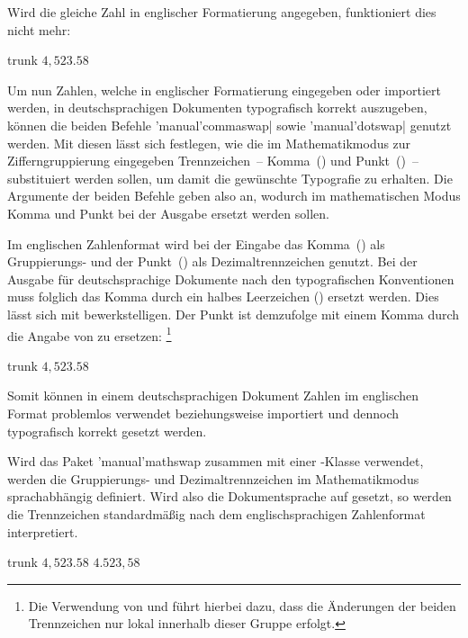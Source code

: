 \documentclass[%
  english,ngerman,%
  headings=small,%
]{tudscrartcl}
\begin{document}
\begin{Entity}{}
Wird die gleiche Zahl in englischer Formatierung angegeben, funktioniert dies 
nicht mehr:
%
\begin{Code}[input]{trunk}
\(4,523.58\)

\end{Code}

Um nun Zahlen, welche in englischer Formatierung eingegeben oder importiert 
werden, in deutschsprachigen Dokumenten typografisch korrekt auszugeben, können
die beiden Befehle \Macro'manual'{commaswap|\MPValue{\dots}} sowie 
\Macro'manual'{dotswap|\MPValue{\dots}} genutzt werden. Mit diesen lässt 
sich festlegen, wie die im Mathematikmodus zur Zifferngruppierung eingegeben 
Trennzeichen~-- Komma~(\PValue{,}) und Punkt~()~-- substituiert 
werden sollen, um damit die gewünschte Typografie zu erhalten. Die Argumente 
der beiden Befehle geben also an, wodurch im mathematischen Modus Komma und 
Punkt bei der Ausgabe ersetzt werden sollen.

Im englischen Zahlenformat wird bei der Eingabe das Komma~(\PValue{,}) als 
Gruppierungs- und der Punkt~() als Dezimaltrennzeichen genutzt. Bei 
der Ausgabe für deutschsprachige Dokumente nach den typografischen Konventionen 
muss folglich das Komma durch ein halbes Leerzeichen (\Macro*{,}) ersetzt 
werden. Dies lässt sich mit  
bewerkstelligen. Der Punkt ist demzufolge mit einem Komma durch die Angabe von
 zu ersetzen:%
\footnote{%
  Die Verwendung von  und  führt hierbei 
  dazu, dass die Änderungen der beiden Trennzeichen nur lokal innerhalb dieser 
  Gruppe erfolgt.
}
%
\begin{Code}[input]{trunk}
\begingroup
  \commaswap{\,}
  \dotswap{,}
  \(4,523.58\)
\endgroup

\end{Code}

Somit können in einem deutschsprachigen Dokument Zahlen im englischen Format 
problemlos verwendet beziehungsweise importiert und dennoch typografisch 
korrekt gesetzt werden.




Wird das Paket \Package'manual'{mathswap} zusammen mit einer \TUDScript-Klasse 
verwendet, werden die Gruppierungs- und Dezimaltrennzeichen im Mathematikmodus 
sprachabhängig definiert. Wird also die Dokumentsprache auf  
gesetzt, so werden die Trennzeichen standardmäßig nach dem englischsprachigen 
Zahlenformat interpretiert.
%
\begin{Code}[input]{trunk}
\begingroup
  \(4,523.58\)\newline
  \(4.523,58\)
\endgroup


\end{Code}
\end{Entity}
\end{document}
